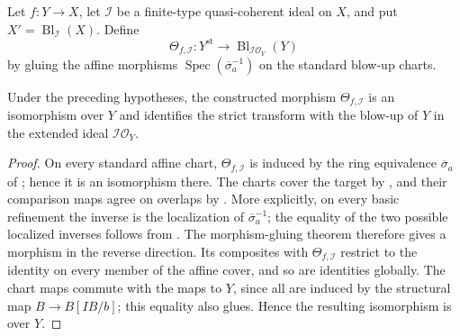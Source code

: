 \begin{definition}
  \label{def:nagata-strict-transform-blowup-comparison}

  Let $f\colon Y\to X$, let $\mathcal I$ be a finite-type quasi-coherent
  ideal on $X$, and put $X'=\operatorname{Bl}_{\mathcal I}(X)$.  Define
  \[
    \Theta_{f,\mathcal I}\colon
      Y^{\mathrm{st}}\longrightarrow
      \operatorname{Bl}_{\mathcal I\mathcal O_Y}(Y)
  \]
  by gluing the affine morphisms
  $\operatorname{Spec}(\overline\sigma_a^{-1})$ on the standard blow-up
  charts.
\end{definition}

\begin{theorem}
  \label{thm:nagata-strict-transform-is-blowup}

  Under the preceding hypotheses, the constructed morphism
  $\Theta_{f,\mathcal I}$ is an isomorphism over
  $Y$ and identifies the strict transform with the blow-up of $Y$ in the
  extended ideal $\mathcal I\mathcal O_Y$.
\end{theorem}

\begin{proof}
  On every standard affine chart, $\Theta_{f,\mathcal I}$ is induced by the
  ring equivalence $\overline\sigma_a$ of
  ; hence it is an isomorphism
  there.  The charts cover the target by
  , and their comparison maps
  agree on overlaps by .
  More explicitly, on every basic refinement the inverse is the localization
  of $\overline\sigma_a^{-1}$; the equality of the two possible localized
  inverses follows from
  .  The
  morphism-gluing theorem therefore gives a morphism in the reverse direction.
  Its composites with $\Theta_{f,\mathcal I}$ restrict to the identity on
  every member of the affine cover, and so are identities globally.  The
  chart maps commute with the maps to $Y$, since all are induced by the
  structural map $B\to B[IB/b]$; this equality also glues.  Hence the
  resulting isomorphism is over $Y$.
\end{proof}


